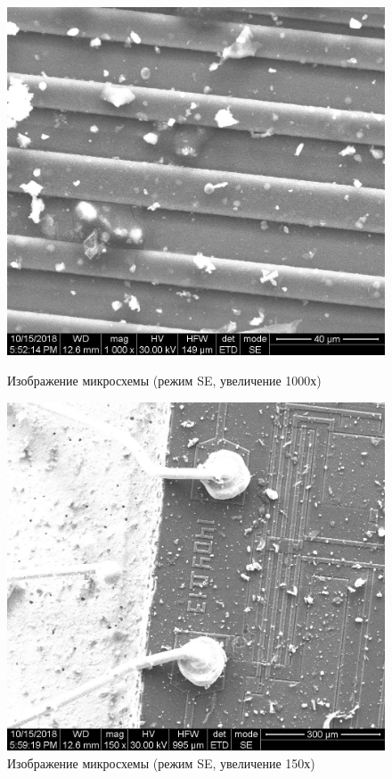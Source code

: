 \documentclass[a4paper]{article}
\begin{document}
\begin{enumerate}
    \begin{figure}[h]
\begin{center}
\begin{minipage}[h]{0.45\linewidth}
\includegraphics[width=1\linewidth]{iv1mikroch_002.jpg}
\caption{Изображение микросхемы (режим SE, увеличение 1000х)} %
\end{minipage}
\hfill 
\begin{minipage}[h]{0.45\linewidth}
\includegraphics[width=1\linewidth]{iv1mikroch_004.jpg}
\caption{Изображение микросхемы (режим SE, увеличение 150х)}
\label{ris:experimcoded}
\end{minipage}
\end{center}
\end{figure}


\end{enumerate}
\end{document}
